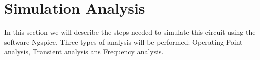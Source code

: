 \section{Simulation Analysis}
\label{sec:simulation}
In this section we will describe the steps needed to simulate this circuit using the software Ngspice. Three types of analysis will be performed: Operating Point analysis, Transient analysis ans Frequency analysis.


\pagebreak
